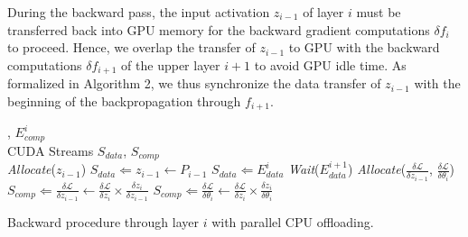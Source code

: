 \documentclass[11pt,onecolumn]{article}
\begin{document}

During the backward pass, the input activation $z_{i-1}$ 
of layer $i$ must be transferred back into GPU memory
for the backward gradient computations $\delta f_i$ to proceed.
Hence, we overlap the transfer of $z_{i-1}$ to GPU 
with the backward computations $\delta f_{i+1}$ of the upper layer $i+1$ to avoid GPU idle time.
As formalized in Algorithm 2, we thus synchronize the data transfer of $z_{i-1}$ 
with the beginning of the backpropagation through $f_{i+1}$.

\begin{algorithm}[h]
	, $E_{comp}^{i}$
     	\\ \hspace{1.1cm} CUDA Streams $S_{data}$, $S_{comp}$%
	\vspace{1mm} \\
	\vspace{1mm}
	\textit{Allocate}($z_{i-1}$)\;
	\vspace{1mm}
	$S_{data} \Leftarrow z_{i-1} \leftarrow P_{i-1}$\;
	$S_{data} \Leftarrow E_{data}^i$\;
	\vspace{1mm}
	\textit{Wait}($E_{data}^{i+1}$)\;
	\textit{Allocate}($\frac{\delta \mathcal{L}}{\delta z_{i-1}}$, $\frac{\delta \mathcal{L}}{\delta \theta_i}$)\;
	\vspace{1mm}
	$S_{comp} \Leftarrow \frac{\delta \mathcal{L}}{\delta z_{i-1}} \leftarrow \frac{\delta \mathcal{L}}{\delta z_{i}}  \times \frac{\delta z_{i}}{\delta z_{i-1}}$\;
	$S_{comp} \Leftarrow \frac{\delta \mathcal{L}}{\delta \theta_i} \leftarrow \frac{\delta \mathcal{L}}{\delta z_{i}}  \times \frac{\delta z_{i}}{\delta \theta_i}$\;
	\caption{Backward procedure through layer $i$ with parallel CPU offloading.}
\end{algorithm}
\end{document}
